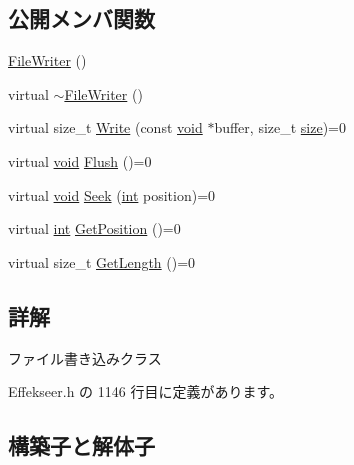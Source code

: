 \subsection*{公開メンバ関数}
\begin{DoxyCompactItemize}
\item 
\mbox{\hyperlink{class_effekseer_1_1_file_writer_a7f8a88996d7bffbff900787feebd81dd}{File\+Writer}} ()
\item 
virtual \mbox{\hyperlink{class_effekseer_1_1_file_writer_aa4959a2a84ec4754b615d6b665d71988}{$\sim$\+File\+Writer}} ()
\item 
virtual size\+\_\+t \mbox{\hyperlink{class_effekseer_1_1_file_writer_a7bdd5dc4f70f8e83c03de7e96af5dc27}{Write}} (const \mbox{\hyperlink{namespace_effekseer_ab34c4088e512200cf4c2716f168deb56}{void}} $\ast$buffer, size\+\_\+t \mbox{\hyperlink{namespace_effekseer_a73c68f3d33539d30844b9d1e058077f7}{size}})=0
\item 
virtual \mbox{\hyperlink{namespace_effekseer_ab34c4088e512200cf4c2716f168deb56}{void}} \mbox{\hyperlink{class_effekseer_1_1_file_writer_a319bba7ef4e98e98a5248accbee98df1}{Flush}} ()=0
\item 
virtual \mbox{\hyperlink{namespace_effekseer_ab34c4088e512200cf4c2716f168deb56}{void}} \mbox{\hyperlink{class_effekseer_1_1_file_writer_a9057c57df33d5112bc0d2c4e3e0c542d}{Seek}} (\mbox{\hyperlink{namespace_effekseer_ace0abf7c2e6947e519ebe8b54cbcc30a}{int}} position)=0
\item 
virtual \mbox{\hyperlink{namespace_effekseer_ace0abf7c2e6947e519ebe8b54cbcc30a}{int}} \mbox{\hyperlink{class_effekseer_1_1_file_writer_a656bbee191e65ccc63791d5c41c6e853}{Get\+Position}} ()=0
\item 
virtual size\+\_\+t \mbox{\hyperlink{class_effekseer_1_1_file_writer_a6baf95dec7700d2c7a5e71c6c4f76724}{Get\+Length}} ()=0
\end{DoxyCompactItemize}


\subsection{詳解}
ファイル書き込みクラス 

 Effekseer.\+h の 1146 行目に定義があります。



\subsection{構築子と解体子}
\mbox{\label{class_effekseer_1_1_file_writer_a7f8a88996d7bffbff900787feebd81dd}} 
